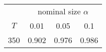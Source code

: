 % 
\begin{tabular}{cccc}
  \hline
  & \multicolumn{3}{c}{nominal size $\alpha$} \\
 $T$ & 0.01 & 0.05 & 0.1 \\
 \hline
350 & 0.902 & 0.976 & 0.986 \\ 
   \hline
\end{tabular}
